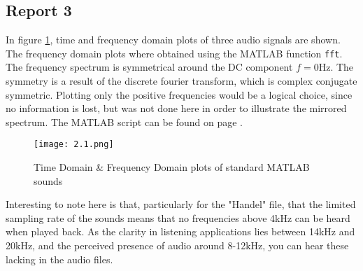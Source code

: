 \subsection*{Report 3}

	In figure \ref{figure:2_1}, time and frequency domain plots of three audio signals are shown. The frequency domain plots where obtained using the MATLAB function \verb+fft+. The frequency spectrum is symmetrical around the DC component $f = 0 \si{\hertz}$. The symmetry is a result of the discrete fourier transform, which is complex conjugate symmetric. Plotting only the positive frequencies would be a logical choice, since no information is lost, but was not done here in order to illustrate the mirrored spectrum. The MATLAB script can be found on page \pageref{matlab_2.1}.

	\begin{figure}[H] 
		\centering
		\texttt{[image: 2.1.png]}
		\caption{Time Domain \& Frequency Domain plots of standard MATLAB sounds}
		\label{figure:2_1}
	\end{figure}

	Interesting to note here is that, particularly for the "Handel" file, that the limited sampling rate of the sounds means that no frequencies above 4kHz can be heard when played back. As the clarity in listening applications lies between 14kHz and 20kHz, and the perceived presence of audio around 8-12kHz, you can hear these lacking in the audio files.
		